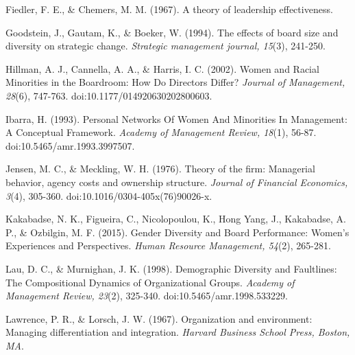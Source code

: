 \begin{thebibliography}{99\kern\bibindent}
\begin{singlespace}
Fiedler, F. E., \& Chemers, M. M. (1967). A theory of leadership effectiveness.
\end{singlespace}

\begin{singlespace}
Goodstein, J., Gautam, K., \& Boeker, W. (1994). The effects of board size and diversity on strategic change. \emph{Strategic management journal, 15}(3), 241-250.
\end{singlespace}

\begin{singlespace}
Hillman, A. J., Cannella, A. A., \& Harris, I. C. (2002). Women and Racial Minorities in the Boardroom: How Do Directors Differ? \emph{Journal of Management, 28}(6), 747-763. doi:10.1177/014920630202800603.
\end{singlespace}

\begin{singlespace}
Ibarra, H. (1993). Personal Networks Of Women And Minorities In Management: A Conceptual Framework. \emph{Academy of Management Review, 18}(1), 56-87. doi:10.5465/amr.1993.3997507.
\end{singlespace}

\begin{singlespace}
Jensen, M. C., \& Meckling, W. H. (1976). Theory of the firm: Managerial behavior, agency costs and ownership structure. \emph{Journal of Financial Economics, 3}(4), 305-360. doi:10.1016/0304-405x(76)90026-x.
\end{singlespace}

\begin{singlespace}
Kakabadse, N. K., Figueira, C., Nicolopoulou, K., Hong Yang, J., Kakabadse, A. P., \& Ozbilgin, M. F. (2015). Gender Diversity and Board Performance: Women's Experiences and Perspectives. \emph{Human Resource Management, 54}(2), 265-281.
\end{singlespace}

\begin{singlespace}
Lau, D. C., \& Murnighan, J. K. (1998). Demographic Diversity and Faultlines: The Compositional Dynamics of Organizational Groups. \emph{Academy of Management Review, 23}(2), 325-340. doi:10.5465/amr.1998.533229.
\end{singlespace}

\begin{singlespace}
Lawrence, P. R., \& Lorsch, J. W. (1967). Organization and environment: Managing differentiation and integration. \emph{Harvard Business School Press, Boston, MA}.
\end{singlespace}


\end{thebibliography}
